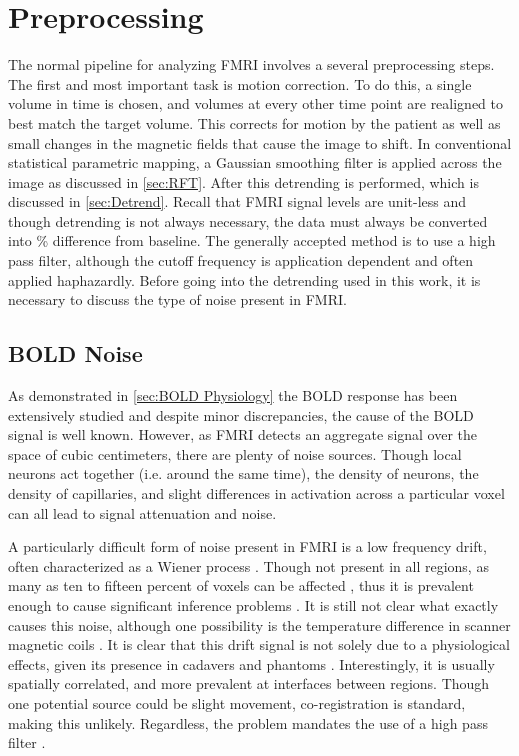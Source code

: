 \section{Preprocessing}
\label{sec:Methods Preprocessing}
The normal pipeline for analyzing
FMRI involves a several preprocessing steps. The first and most important
task is motion correction. To do this, a single volume in time is chosen, and
volumes at every other time point are realigned to best match the target volume. This corrects
for motion by the patient as well as small changes in the magnetic
fields that cause the image to shift.
In conventional statistical parametric mapping, a Gaussian smoothing
filter is applied across the image as discussed in \autoref{sec:RFT}.
After this detrending is performed, which is discussed in \autoref{sec:Detrend}.
Recall that FMRI signal levels are unit-less and though detrending is not
always necessary, the data must always be converted
into \% difference from baseline.
The generally accepted method is to use a high pass filter, although the
cutoff frequency is application dependent and often applied haphazardly.
Before going into the detrending used in this work, it is necessary to
discuss the type of noise present in FMRI.

\subsection{BOLD Noise}
\label{sec:Introduction Noise}
As demonstrated in \autoref{sec:BOLD Physiology} the BOLD response has been
extensively studied and despite minor discrepancies, the cause of the BOLD
signal is well known. However, as FMRI detects an
aggregate signal over the space of cubic centimeters, there are
plenty of noise sources. Though local neurons act
together (i.e. around the same time), the density of neurons, the
density of capillaries, and slight differences in activation across
a particular voxel can all lead to signal attenuation and noise.

A particularly difficult form of noise present in FMRI is a low frequency
drift, often characterized as a Wiener process \cite{Riera2004}.
Though not present in all regions, as many as ten to fifteen percent
of voxels can be affected \cite{Tanabe2002}, thus it is prevalent enough to cause significant
inference problems \cite{Smith2007}. It is still not
clear what exactly causes this noise, although one possibility is
the temperature difference in scanner magnetic coils \cite{Smith2007}.
It is clear that this drift signal is not solely
due to a physiological effects, given its presence in cadavers and phantoms
\cite{Smith1999}. Interestingly, it is usually spatially correlated, and
more prevalent at interfaces between regions. Though one potential source
could be slight movement, co-registration is standard, making this unlikely.
Regardless, the problem mandates the use of a high pass filter \cite{Smith2007}.

